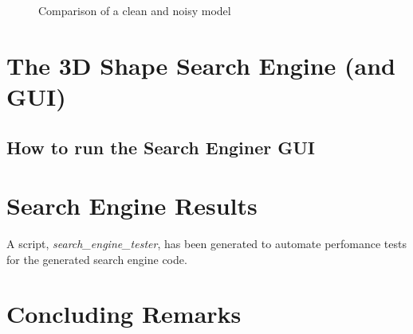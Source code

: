 \documentclass[12pt]{article}
\begin{document}
	\begin{figure}[!h]
		\centering
		\caption{Comparison of a clean and noisy model}
		\label{fig::veryDeadCat}
	\end{figure}


\section*{The 3D Shape Search Engine (and GUI)}

	\noindent


	\subsection*{How to run the Search Enginer GUI}



\section*{Search Engine Results}

	\noindent
	A script, \emph{search\_engine\_tester}, has been generated to automate perfomance tests for the generated search engine code. 




\section*{Concluding Remarks}



	{}
	
\end{document}
